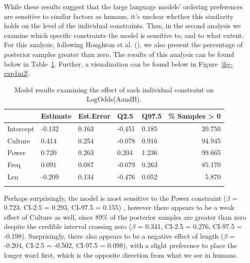 \documentclass[
  nottoc]{article}
\begin{document}
While these results suggest that the large language models' ordering
preferences are sensitive to similar factors as humans, it's unclear
whether this similarity holds on the level of the individual
constraints. Thus, in the second analysis we examine which specific
constraints the model is sensitive to, and to what extent. For this
analysis, following Houghton et al.
(),
we also present the percentage of posterior samples greater than zero.
The results of this analysis can be found below in
Table~\ref{tbl-exp1m2}. Further, a visualization can be found below in
Figure~\ref{fig-exp1m2}.

\begin{longtable}[]{@{}lllllr@{}}

\toprule\noalign{}
& Estimate & Est.Error & Q2.5 & Q97.5 & \% Samples \textgreater{} 0 \\
\midrule\noalign{}
\endhead
\bottomrule\noalign{}
\endlastfoot
Intercept & -0.132 & 0.163 & -0.451 & 0.185 & 20.750 \\
Culture & 0.414 & 0.254 & -0.078 & 0.916 & 94.945 \\
Power & 0.720 & 0.263 & 0.204 & 1.236 & 99.665 \\
Freq & 0.091 & 0.087 & -0.079 & 0.263 & 85.170 \\
Len & -0.209 & 0.134 & -0.476 & 0.052 & 5.870 \\


\caption{\label{tbl-exp1m2}Model results examining the effect of each
individual constraint on LogOdds(AandB).}

\tabularnewline
\end{longtable}

Perhaps surprisingly, the model is most sensitive to the Power
constraint (\(\beta\) = 0.723, CI-2.5 = 0.293, CI-97.5 = 0.155) ,
however there appears to be a weak effect of Culture as well, since 89\%
of the posterior samples are greater than zero despite the credible
interval crossing zero (\(\beta\) = 0.341, CI-2.5 = 0.276, CI-97.5 =
-0.198). Surprisingly, there also appears to be a negative effect of
length (\(\beta\) = -0.204, CI-2.5 = -0.502, CI-97.5 = 0.098), with a
slight preference to place the longer word first, which is the opposite
direction from what we see in humans.
\end{document}
